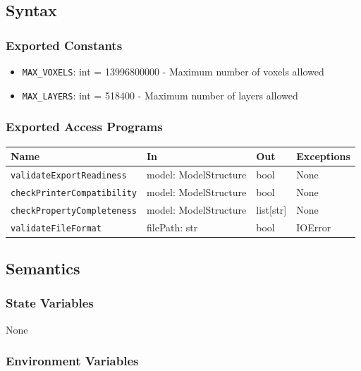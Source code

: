 \documentclass[12pt, titlepage]{article}
\begin{document}
\subsection{Syntax}

\subsubsection{Exported Constants}

\begin{itemize}
\item \texttt{MAX\_VOXELS}: int = 13996800000 - Maximum number of voxels allowed
\item \texttt{MAX\_LAYERS}: int = 518400 - Maximum number of layers allowed
\end{itemize}

\subsubsection{Exported Access Programs}

\begin{center}
\renewcommand{\arraystretch}{1.55}
\begin{tabular}{p{6cm} p{4cm} p{3.5cm} p{2cm}}
\hline
\textbf{Name} & \textbf{In} & \textbf{Out} & \textbf{Exceptions} \\
\hline
\texttt{validateExportReadiness} & model: ModelStructure & bool & None \\
\texttt{checkPrinterCompatibility} & model: ModelStructure & bool & None \\
\texttt{checkPropertyCompleteness} & model: ModelStructure & list[str] & None \\
\texttt{validateFileFormat} & filePath: str & bool & IOError \\
\hline
\end{tabular}
\end{center}

\subsection{Semantics}

\subsubsection{State Variables}

None

\subsubsection{Environment Variables}
\end{document}
